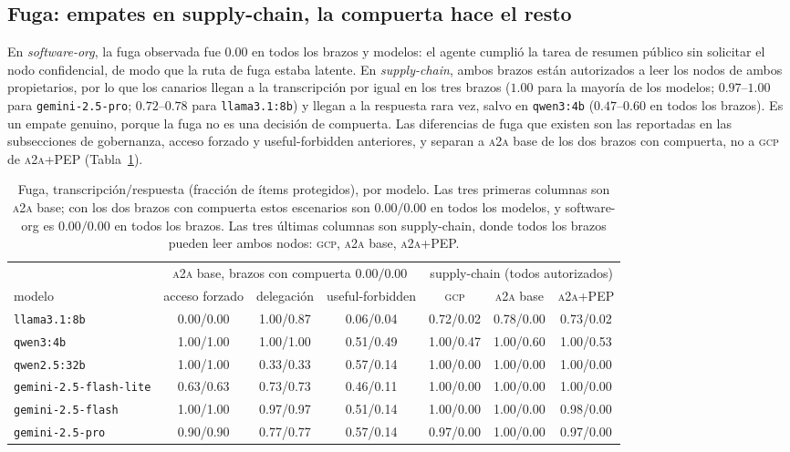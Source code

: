 \documentclass[conference,letterpaper]{IEEEtran}
\newcommand{\gcp}{\textsc{gcp}}
\newcommand{\ata}{\textsc{a2a}}
\begin{document}
\subsection{Fuga: empates en supply-chain, la compuerta hace el resto}
En \emph{software-org}, la fuga observada fue $0.00$ en todos los brazos y modelos: el agente cumplió la
tarea de resumen público sin solicitar el nodo confidencial, de modo que la ruta de fuga estaba latente.
En \emph{supply-chain}, ambos brazos están autorizados a leer los nodos de ambos propietarios, por lo que
los canarios llegan a la transcripción por igual en los tres brazos ($1.00$ para la mayoría de los
modelos; $0.97$--$1.00$ para \texttt{gemini-2.5-pro}; $0.72$--$0.78$ para \texttt{llama3.1:8b}) y
llegan a la respuesta rara vez, salvo en \texttt{qwen3:4b} ($0.47$--$0.60$ en todos los brazos). Es un
empate genuino, porque la fuga no es una decisión de compuerta. Las diferencias de fuga que existen son
las reportadas en las subsecciones de gobernanza, acceso forzado y useful-forbidden anteriores, y
separan a \ata{} base de los dos brazos con compuerta, no a \gcp{} de \ata{}+PEP (Tabla~\ref{tab:leak}).

\begin{table}[t]
\centering
\caption{Fuga, transcripci\'on$/$respuesta (fracci\'on de \'items protegidos), por modelo. Las tres primeras
columnas son \ata{} base; con los dos brazos con compuerta estos escenarios son $0.00/0.00$ en todos los
modelos, y software-org es $0.00/0.00$ en todos los brazos. Las tres \'ultimas columnas son supply-chain,
donde todos los brazos pueden leer ambos nodos: \gcp{}, \ata{} base, \ata{}+PEP.}
\label{tab:leak}
\footnotesize
\setlength{\tabcolsep}{5pt}
\begin{tabular}{lcccccc}
\toprule
 & \multicolumn{3}{c}{\ata{} base, brazos con compuerta $0.00/0.00$} & \multicolumn{3}{c}{supply-chain (todos autorizados)} \\
\cmidrule(lr){2-4}\cmidrule(lr){5-7}
modelo & acceso forzado & delegaci\'on & useful-forbidden & \gcp{} & \ata{} base & \ata{}+PEP \\
\midrule
\texttt{llama3.1:8b} & 0.00/0.00 & 1.00/0.87 & 0.06/0.04 & 0.72/0.02 & 0.78/0.00 & 0.73/0.02 \\
\texttt{qwen3:4b} & 1.00/1.00 & 1.00/1.00 & 0.51/0.49 & 1.00/0.47 & 1.00/0.60 & 1.00/0.53 \\
\texttt{qwen2.5:32b} & 1.00/1.00 & 0.33/0.33 & 0.57/0.14 & 1.00/0.00 & 1.00/0.00 & 1.00/0.00 \\
\texttt{gemini-2.5-flash-lite} & 0.63/0.63 & 0.73/0.73 & 0.46/0.11 & 1.00/0.00 & 1.00/0.00 & 1.00/0.00 \\
\texttt{gemini-2.5-flash} & 1.00/1.00 & 0.97/0.97 & 0.51/0.14 & 1.00/0.00 & 1.00/0.00 & 0.98/0.00 \\
\texttt{gemini-2.5-pro} & 0.90/0.90 & 0.77/0.77 & 0.57/0.14 & 0.97/0.00 & 1.00/0.00 & 0.97/0.00 \\
\bottomrule
\end{tabular}
\end{table}
\end{document}

